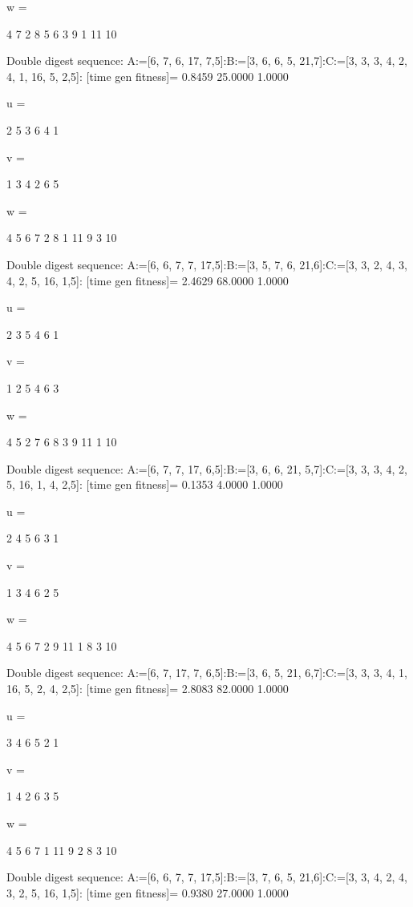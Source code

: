 w =

     4     7     2     8     5     6     3     9     1    11    10

Double digest sequence:
A:=[6, 7, 6, 17, 7,5]:B:=[3, 6, 6, 5, 21,7]:C:=[3, 3, 3, 4, 2, 4, 1, 16, 5, 2,5]:
[time gen fitness]=
    0.8459   25.0000    1.0000


u =

     2     5     3     6     4     1


v =

     1     3     4     2     6     5


w =

     4     5     6     7     2     8     1    11     9     3    10

Double digest sequence:
A:=[6, 6, 7, 7, 17,5]:B:=[3, 5, 7, 6, 21,6]:C:=[3, 3, 2, 4, 3, 4, 2, 5, 16, 1,5]:
[time gen fitness]=
    2.4629   68.0000    1.0000


u =

     2     3     5     4     6     1


v =

     1     2     5     4     6     3


w =

     4     5     2     7     6     8     3     9    11     1    10

Double digest sequence:
A:=[6, 7, 7, 17, 6,5]:B:=[3, 6, 6, 21, 5,7]:C:=[3, 3, 3, 4, 2, 5, 16, 1, 4, 2,5]:
[time gen fitness]=
    0.1353    4.0000    1.0000


u =

     2     4     5     6     3     1


v =

     1     3     4     6     2     5


w =

     4     5     6     7     2     9    11     1     8     3    10

Double digest sequence:
A:=[6, 7, 17, 7, 6,5]:B:=[3, 6, 5, 21, 6,7]:C:=[3, 3, 3, 4, 1, 16, 5, 2, 4, 2,5]:
[time gen fitness]=
    2.8083   82.0000    1.0000


u =

     3     4     6     5     2     1


v =

     1     4     2     6     3     5


w =

     4     5     6     7     1    11     9     2     8     3    10

Double digest sequence:
A:=[6, 6, 7, 7, 17,5]:B:=[3, 7, 6, 5, 21,6]:C:=[3, 3, 4, 2, 4, 3, 2, 5, 16, 1,5]:
[time gen fitness]=
    0.9380   27.0000    1.0000


